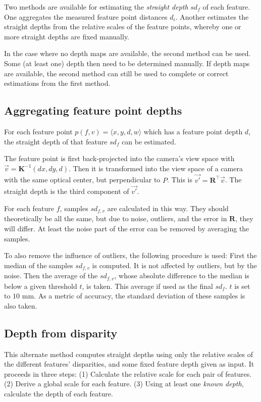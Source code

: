 \documentclass{scrreprt}
\newcommand{\matr}[1]{\mathbf{#1}}
\newcommand{\transpose}[1]{#1^\intercal}
\begin{document}
Two methods are available for estimating the \emph{straight depth} $sd_f$ of each feature. One aggregates the measured feature point distances $d_i$. Another estimates the straight depths from the relative scales of the feature points, whereby one or more straight depths are fixed manually.

In the case where no depth maps are available, the second method can be used. Some (at least one) depth then need to be determined manually. If depth maps are available, the second method can still be used to complete or correct estimations from the first method.

\subsection{Aggregating feature point depths}
\label{sec:sdepth_from_depth}
For each feature point $p(f,v) = \langle x,y,d,w \rangle$ which has a feature point depth $d$, the straight depth of that feature $sd_{f}$ can be estimated.

The feature point is first back-projected into the camera's view space with $\vec{v} = \matr{K}^{-1} (d x, d y, d)$. Then it is transformed into the view space of a camera with the same optical center, but perpendicular to $P$. This is $\vec{v'} = \transpose{\matr{R}} \vec{v}$. The straight depth is the third component of $\vec{v'}$.

For each feature $f$, samples $sd_{f,v}$ are calculated in this way. They should theoretically be all the same, but due to noise, outliers, and the error in $\matr{R}$, they will differ. At least the noise part of the error can be removed by averaging the samples.

To also remove the influence of outliers, the following procedure is used: First the median of the samples $sd_{f,v}$ is computed. It is not affected by outliers, but by the noise. Then the average of the $sd_{f,v}$, whose absolute difference to the median is below a given threshold $t$, is taken. This average if used as the final $sd_f$. $t$ is set to $10 \text{ mm}$. As a metric of accuracy, the standard deviation of these samples is also taken.

\subsection{Depth from disparity}
This alternate method computes straight depths using only the relative scales of the different features' disparities, and some fixed feature depth given as input. It proceeds in three steps: (1) Calculate the relative scale for each pair of features. (2) Derive a global scale for each feature. (3) Using at least one \emph{known depth}, calculate the depth of each feature.
\end{document}
